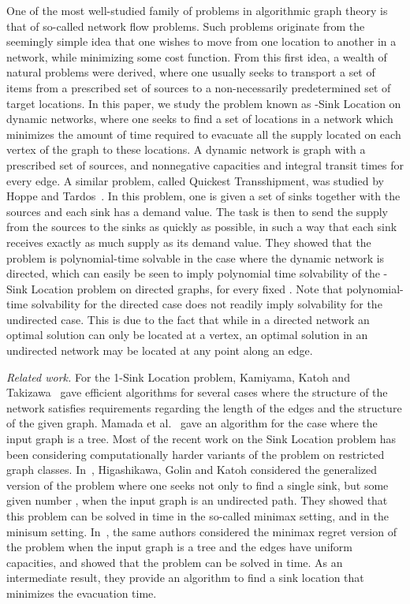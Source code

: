\documentclass[a4paper,10pt]{llncs}
\begin{document}
One of the most well-studied family of problems in algorithmic graph theory is that of so-called network flow problems. Such problems originate from the seemingly simple idea that one wishes to move from one location to another in a network, while minimizing some cost function. From this first idea, a wealth of natural problems were derived, where one usually seeks to transport a set of items from a prescribed set of sources to a non-necessarily predetermined set of target locations. In this paper, we study the problem known as -{\sc Sink Location} on dynamic networks, where one seeks to find a set of locations in a network which minimizes the amount of time required to evacuate all the supply located on each vertex of the graph to these locations. A dynamic network is graph with a prescribed set of sources, and nonnegative capacities and integral transit times for every edge. A similar problem, called {\sc Quickest Transshipment}, was studied by Hoppe and Tardos~\cite{HT00}. In this problem, one is given a set of sinks together with the sources and each sink has a demand value. The task is then to send the supply from the sources to the sinks as quickly as possible, in such a way that each sink receives exactly as much supply as its demand value.  They showed that the problem is polynomial-time solvable in the case where the dynamic network is directed, which can easily be seen to imply polynomial time solvability of the -{\sc Sink Location} problem on directed graphs, for every fixed . Note that polynomial-time solvability for the directed case does not readily imply solvability for the undirected case. This is due to the fact that while in a directed network an optimal solution can only be located at a vertex, an optimal solution in an undirected network may be located at any point along an edge.

{\em Related work.} For the 1-{\sc Sink Location} problem, Kamiyama, Katoh and Takizawa~\cite{KKT06,KKT09} gave efficient algorithms for several cases where the structure of the network satisfies requirements regarding the length of the edges and the structure of the given graph. Mamada et al.~\cite{MUMF06} gave an  algorithm for the case where the input graph is a tree. Most of the recent work on the {\sc Sink Location} problem has been considering computationally harder variants of the problem on restricted graph classes. In~\cite{HGK14}, Higashikawa, Golin and Katoh considered the generalized version of the problem where one seeks not only to find a single sink, but some given number , when the input graph is an undirected path. They showed that this problem can be solved in  time in the so-called minimax setting, and  in the minisum setting. In~\cite{HGK14a}, the same authors considered the minimax  regret version of the problem when the input graph is a tree and the edges have uniform capacities, and showed that the problem can be solved in  time. As an intermediate result, they provide an  algorithm to find a sink location that minimizes the evacuation time.
\end{document}
